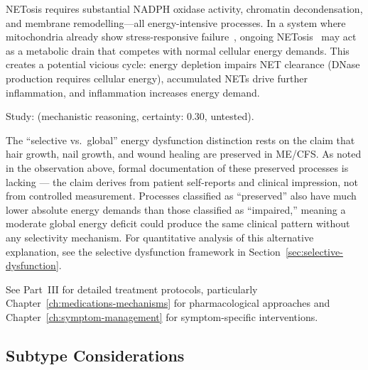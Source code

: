 \begin{speculation}
\label{spec:netosis-metabolic-sink}
NETosis requires substantial NADPH oxidase activity, chromatin decondensation,
and membrane remodelling---all energy-intensive processes. In a system where
mitochondria already show stress-responsive failure~\cite{Cullen2026ATP}, ongoing
NETosis~\cite{Krinsky2023} may act as a metabolic drain that competes with normal
cellular energy demands. This creates a potential vicious cycle: energy depletion
impairs NET clearance (DNase production requires cellular energy), accumulated NETs
drive further inflammation, and inflammation increases energy demand.

Study: (mechanistic reasoning, certainty: 0.30, untested).
\end{speculation}

\begin{limitation}
The ``selective vs.\ global'' energy dysfunction distinction rests on the claim that hair growth, nail growth, and wound healing are preserved in ME/CFS. As noted in the observation above, formal documentation of these preserved processes is lacking --- the claim derives from patient self-reports and clinical impression, not from controlled measurement. Processes classified as ``preserved'' also have much lower absolute energy demands than those classified as ``impaired,'' meaning a moderate global energy deficit could produce the same clinical pattern without any selectivity mechanism. For quantitative analysis of this alternative explanation, see the selective dysfunction framework in Section~\ref{sec:selective-dysfunction}.
\end{limitation}

See Part~III for detailed treatment protocols, particularly Chapter~\ref{ch:medications-mechanisms} for pharmacological approaches and Chapter~\ref{ch:symptom-management} for symptom-specific interventions.

\subsection{Subtype Considerations}
\label{sec:selective-subtypes}

